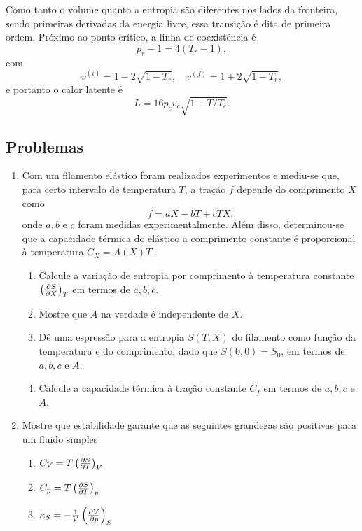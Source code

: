 Como tanto o volume quanto a entropia são diferentes nos lados da fronteira,
sendo primeiras derivadas da energia livre, essa transição é dita de primeira
ordem. Próximo ao ponto crítico, a linha de coexistência é
$$p_r-1=4(T_r-1),$$
com
$$v^{(i)}=1-2\sqrt{1-T_r},\quad v^{(f)}=1+2\sqrt{1-T_r},$$
e portanto o calor latente é
$$L=16p_cv_c\sqrt{1-T/T_c}.$$

\subsection{Problemas}

\begin{enumerate}
    \item
        Com um filamento elástico foram realizados experimentos e mediu-se que,
        para certo intervalo de temperatura $T$, a tração $f$ depende do
        comprimento $X$ como
        $$f=aX-bT+cTX.$$
        onde $a,b$ e $c$ foram medidas experimentalmente. Além disso,
        determinou-se que a capacidade térmica do elástico a comprimento
        constante é proporcional à temperatura $C_X=A(X)T.$
        \begin{enumerate}
            \item
                Calcule a variação de entropia por comprimento à temperatura
                constante $\pd{S}{X}{T}$ em termos de $a,b,c$.
            \item
                Mostre que $A$ na verdade é independente de $X$.
            \item
                Dê uma espressão para a entropia $S(T,X)$ do filamento como
                função da temperatura e do comprimento, dado que $S(0,0)=S_0$,
                em termos de $a,b,c$ e $A$.
            \item 
                Calcule a capacidade térmica à tração constante $C_f$ em termos
                de $a,b,c$ e $A$.
        \end{enumerate}
    \item
        Mostre que estabilidade garante que as seguintes grandezas são positivas
        para um fluido simples
        \begin{enumerate}
            \item $C_V=T\pd{S}{T}{V}$
            \item $C_p=T\pd{S}{T}{p}$
            \item $\kappa_S=-\frac{1}{V}\pd{V}{p}{S}$

\end{enumerate}
\end{enumerate}
